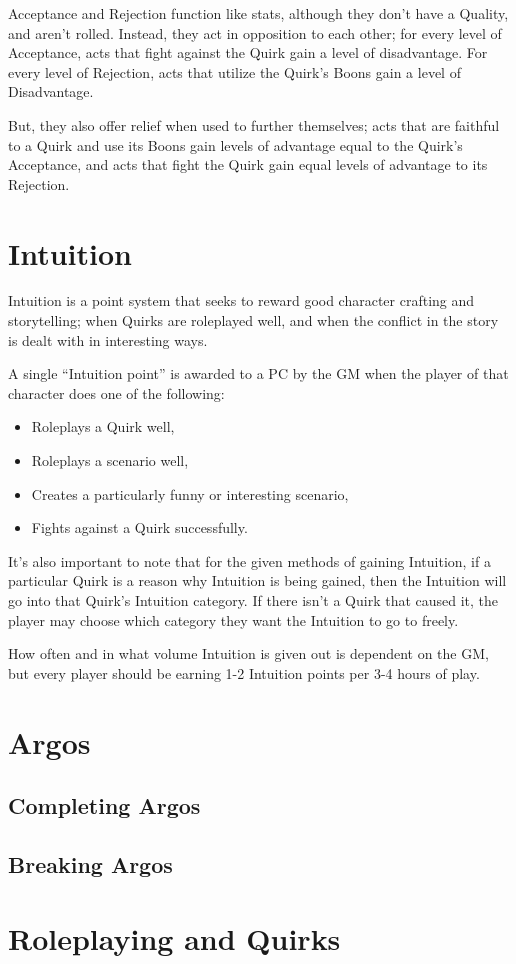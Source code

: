 \documentclass[../main.tex]{subfiles}
\begin{document}
    Acceptance and Rejection function like stats, although they don't have a Quality, and aren't rolled. Instead, they act in opposition to each other; for every level of Acceptance, acts that fight against the Quirk gain a level of disadvantage. For every level of Rejection, acts that utilize the Quirk's Boons gain a level of Disadvantage.

    But, they also offer relief when used to further themselves; acts that are faithful to a Quirk and use its Boons gain levels of advantage equal to the Quirk's Acceptance, and acts that fight the Quirk gain equal levels of advantage to its Rejection.


    \section{Intuition}\label{intuition}

    Intuition is a point system that seeks to reward good character crafting and storytelling; when Quirks are roleplayed well, and when the conflict in the story is dealt with in interesting ways.

    A single ``Intuition point'' is awarded to a PC by the GM when the player of that character does one of the following:

    \begin{itemize}
        \item Roleplays a Quirk well,
        \item Roleplays a scenario well,
        \item Creates a particularly funny or interesting scenario,
        \item Fights against a Quirk successfully.
    \end{itemize}

    It's also important to note that for the given methods of gaining Intuition, if a particular Quirk is a reason why Intuition is being gained, then the Intuition will go into that Quirk's Intuition category. If there isn't a Quirk that caused it, the player may choose which category they want the Intuition to go to freely.

    How often and in what volume Intuition is given out is dependent on the GM, but every player should be earning 1-2 Intuition points per 3-4 hours of play.

    \section{Argos}

    \subsection{Completing Argos}

    \subsection{Breaking Argos}

    \section{Roleplaying and Quirks}
\end{document}
